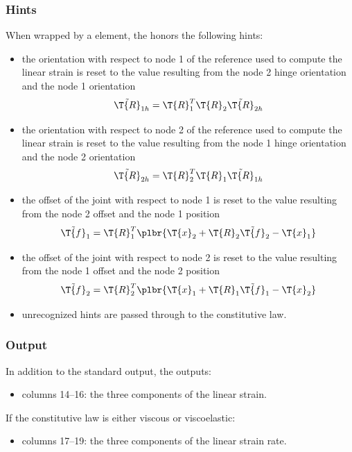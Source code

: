 \subsubsection{Hints}
When wrapped by a  element, the 
honors the following hints:
\begin{itemize}
\item {} the orientation with respect to node 1
of the reference used to compute the linear strain is reset
to the value resulting from the node 2 hinge orientation
and the node 1 orientation
\begin{displaymath}
	\tilde{\T{R}}_{1h} = \T{R}_1^T \T{R}_2 \tilde{\T{R}}_{2h}
\end{displaymath}
\item {} the orientation with respect to node 2
of the reference used to compute the linear strain is reset
to the value resulting from the node 1 hinge orientation
and the node 2 orientation
\begin{displaymath}
	\tilde{\T{R}}_{2h} = \T{R}_2^T \T{R}_1 \tilde{\T{R}}_{1h}
\end{displaymath}
\item {} the offset of the joint
with respect to node 1 is reset to the value resulting 
from the node 2 offset and the node 1 position
\begin{displaymath}
	\tilde{\T{f}}_1 = \T{R}_1^T \plbr{
		\T{x}_2
		+ \T{R}_2 \tilde{\T{f}}_2
		- \T{x}_1
	}
\end{displaymath}
\item {} the offset of the joint
with respect to node 2 is reset to the value resulting 
from the node 1 offset and the node 2 position
\begin{displaymath}
	\tilde{\T{f}}_2 = \T{R}_2^T \plbr{
		\T{x}_1
		+ \T{R}_1 \tilde{\T{f}}_1
		- \T{x}_2
	}
\end{displaymath}
\item unrecognized hints are passed through to the constitutive law.
\end{itemize}

\subsubsection{Output}
In addition to the standard output, the 
outputs:
\begin{itemize}
\item columns 14--16: the three components of the linear strain.
\end{itemize}
If the constitutive law is either viscous or viscoelastic:
\begin{itemize}
\item columns 17--19: the three components of the linear strain rate.
\end{itemize}



